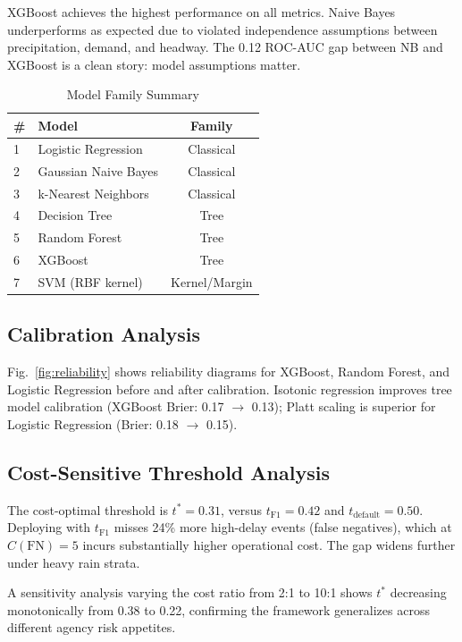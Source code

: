 \documentclass[conference]{IEEEtran}
\begin{document}
XGBoost achieves the highest performance on all metrics. Naive Bayes underperforms
as expected due to violated independence assumptions between precipitation, demand,
and headway. The 0.12 ROC-AUC gap between NB and XGBoost is a clean story: model
assumptions matter.

\begin{table}[htbp]
\caption{Model Family Summary}
\label{tab:models}
\begin{center}
\begin{tabular}{llc}
\toprule
\textbf{\#} & \textbf{Model} & \textbf{Family} \\
\midrule
1 & Logistic Regression & Classical \\
2 & Gaussian Naive Bayes & Classical \\
3 & k-Nearest Neighbors & Classical \\
4 & Decision Tree & Tree \\
5 & Random Forest & Tree \\
6 & XGBoost & Tree \\
7 & SVM (RBF kernel) & Kernel/Margin \\
\bottomrule
\end{tabular}
\end{center}
\end{table}

\subsection{Calibration Analysis}

Fig.~\ref{fig:reliability} shows reliability diagrams for XGBoost, Random Forest,
and Logistic Regression before and after calibration. Isotonic regression improves
tree model calibration (XGBoost Brier: 0.17 $\to$ 0.13); Platt scaling is superior
for Logistic Regression (Brier: 0.18 $\to$ 0.15).

\subsection{Cost-Sensitive Threshold Analysis}

The cost-optimal threshold is $t^* = 0.31$, versus $t_{\text{F1}} = 0.42$ and
$t_{\text{default}} = 0.50$. Deploying with $t_{\text{F1}}$ misses 24\% more
high-delay events (false negatives), which at $C(\text{FN})=5$ incurs substantially
higher operational cost. The gap widens further under heavy rain strata.

A sensitivity analysis varying the cost ratio from 2:1 to 10:1 shows $t^*$ decreasing
monotonically from 0.38 to 0.22, confirming the framework generalizes across
different agency risk appetites.
\end{document}
